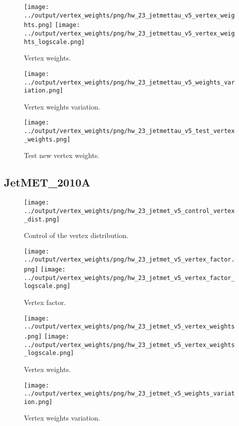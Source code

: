 \documentclass[11pt]{book}
\begin{document}
\begin{figure}[ht]
\centering
\texttt{[image: ../output/vertex\_weights/png/hw\_23\_jetmettau\_v5\_vertex\_weights.png]}
\texttt{[image: ../output/vertex\_weights/png/hw\_23\_jetmettau\_v5\_vertex\_weights\_logscale.png]}
\caption{Vertex weights.}
\end{figure}

\begin{figure}[ht]
\centering
\texttt{[image: ../output/vertex\_weights/png/hw\_23\_jetmettau\_v5\_weights\_variation.png]}
\caption{Vertex weights variation.}
\end{figure}

\begin{figure}[ht]
\centering
\texttt{[image: ../output/vertex\_weights/png/hw\_23\_jetmettau\_v5\_test\_vertex\_weights.png]}
\caption{Test new vertex weights.}
\end{figure}
\clearpage

\subsection{JetMET\_2010A}
\begin{figure}[ht]
\centering
\texttt{[image: ../output/vertex\_weights/png/hw\_23\_jetmet\_v5\_control\_vertex\_dist.png]}
\caption{Control of the vertex distribution.}
\end{figure}

\begin{figure}[ht]
\centering
\texttt{[image: ../output/vertex\_weights/png/hw\_23\_jetmet\_v5\_vertex\_factor.png]}
\texttt{[image: ../output/vertex\_weights/png/hw\_23\_jetmet\_v5\_vertex\_factor\_logscale.png]}
\caption{Vertex factor.}
\end{figure}

\begin{figure}[ht]
\centering
\texttt{[image: ../output/vertex\_weights/png/hw\_23\_jetmet\_v5\_vertex\_weights.png]}
\texttt{[image: ../output/vertex\_weights/png/hw\_23\_jetmet\_v5\_vertex\_weights\_logscale.png]}
\caption{Vertex weights.}
\end{figure}

\begin{figure}[ht]
\centering
\texttt{[image: ../output/vertex\_weights/png/hw\_23\_jetmet\_v5\_weights\_variation.png]}
\caption{Vertex weights variation.}
\end{figure}
\end{document}
